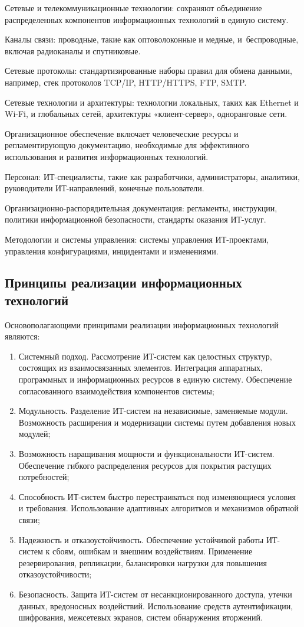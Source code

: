 \documentclass{ou}
\begin{document}
Сетевые и телекоммуникационные технологии: сохраняют объединение распределенных компонентов информационных технологий в единую систему.

Каналы связи: проводные, такие как оптоволоконные и медные, и~беспроводные, включая радиоканалы и спутниковые.

Сетевые протоколы: стандартизированные наборы правил для обмена данными, например, стек протоколов TCP/IP, HTTP/HTTPS, FTP, SMTP.

Сетевые технологии и архитектуры: технологии локальных, таких как Ethernet и Wi-Fi, и глобальных сетей, архитектуры «клиент-сервер», одноранговые сети\cite{sviazexpo}.

Организационное обеспечение включает человеческие ресурсы и регламентирующую документацию, необходимые для эффективного использования и развития информационных технологий.

Персонал: ИТ-специалисты, такие как разработчики, администраторы, аналитики, руководители ИТ-направлений, конечные пользователи.

Организационно-распорядительная документация: регламенты, инструкции, политики информационной безопасности, стандарты оказания ИТ-услуг.

Методологии и системы управления: системы управления ИТ-проектами, управления конфигурациями, инцидентами и изменениями\cite{Cspo}.

\subsection{Принципы реализации информационных технологий}
Основополагающими принципами реализации информационных технологий являются:
\begin{enumerate}[leftmargin=0em, itemindent=3.75em, nosep, label=\arabic*)]
\item Системный подход. Рассмотрение ИТ-систем как целостных структур, состоящих из взаимосвязанных элементов. Интеграция аппаратных, программных и информационных ресурсов в единую систему. Обеспечение согласованного взаимодействия компонентов системы;
\item  Модульность. Разделение ИТ-систем на независимые, заменяемые модули. Возможность расширения и модернизации системы путем добавления новых модулей;
\item Возможность наращивания мощности и функциональности ИТ-систем. Обеспечение гибкого распределения ресурсов для покрытия растущих потребностей;
\item Способность ИТ-систем быстро перестраиваться под изменяющиеся условия и требования. Использование адаптивных алгоритмов и механизмов обратной связи;
\item Надежность и отказоустойчивость. Обеспечение устойчивой работы ИТ-систем к сбоям, ошибкам и внешним воздействиям. Применение резервирования, репликации, балансировки нагрузки для повышения отказоустойчивости;
\item Безопасность. Защита ИТ-систем от несанкционированного доступа, утечки данных, вредоносных воздействий. Использование средств аутентификации, шифрования, межсетевых экранов, систем обнаружения вторжений\cite{Portal.tpu}.
\end{enumerate}
\end{document}
